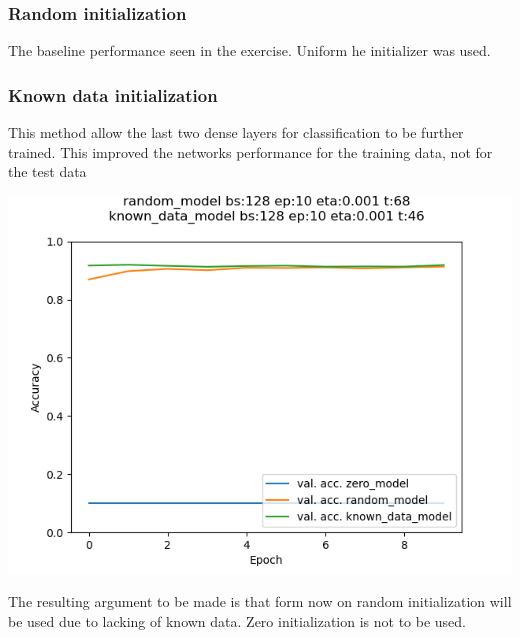 \documentclass{article}
\newenvironment{Figure}
{\par\medskip\noindent\minipage{\linewidth}}
{\endminipage\par\medskip}
\begin{document}
\begin{multicols}{2}
\subsubsection{Random initialization}
The baseline performance seen in the exercise. Uniform he initializer was used.

\subsubsection{Known data initialization}
This method allow the last two dense layers for classification to be further trained. This improved the networks performance for the training data, not for the test data
\begin{Figure}
	\label{fig:known_init}
	\centering
	\includegraphics[width=\linewidth]{../img_1_1_init/acc_plot_init}
\end{Figure}

The resulting argument to be made is that form now on random initialization will be used due to lacking of known data. Zero initialization is not to be used.


\end{multicols}
\end{document}
